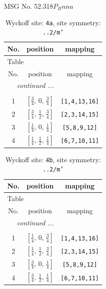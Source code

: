 \documentclass[fleqn,8pt]{jsarticle}
\begin{document}
\setcounter{MaxMatrixCols}{32}

\renewcommand{\tablename}{Table~}
\renewcommand{\figurename}{Figure~}
\begin{center}
\LARGE
MSG No. 52.318\quad$P_{B}nna$
\end{center}
\renewcommand{\arraystretch}{1.2}
\begin{longtable}{ccc}
\caption{Wyckoff site: {\tt 4a}, site symmetry: {\tt ..2/m'}}
 \\
 \hline \hline
No. & position & mapping \\ \hline \endfirsthead

\multicolumn{2}{l}{\tablename\ \thetable{}} \\
 \hline \hline
No. & position & mapping \\ \hline \endhead

 \hline \hline
\multicolumn{2}{r}{\footnotesize\it continued ...} \\ \endfoot

 \hline \hline
\multicolumn{2}{r}{} \\ \endlastfoot

1 & $\left[ \frac{3}{4},\, 0,\, \frac{3}{4} \right]$ & {\tt [1,4,13,16]} \\ \hline
2 & $\left[ \frac{3}{4},\, \frac{1}{2},\, \frac{3}{4} \right]$ & {\tt [2,3,14,15]} \\ \hline
3 & $\left[ \frac{1}{4},\, 0,\, \frac{1}{4} \right]$ & {\tt [5,8,9,12]} \\ \hline
4 & $\left[ \frac{1}{4},\, \frac{1}{2},\, \frac{1}{4} \right]$ & {\tt [6,7,10,11]} \\
\end{longtable}
\renewcommand{\arraystretch}{1.2}
\begin{longtable}{ccc}
\caption{Wyckoff site: {\tt 4b}, site symmetry: {\tt ..2/m'}}
 \\
 \hline \hline
No. & position & mapping \\ \hline \endfirsthead

\multicolumn{2}{l}{\tablename\ \thetable{}} \\
 \hline \hline
No. & position & mapping \\ \hline \endhead

 \hline \hline
\multicolumn{2}{r}{\footnotesize\it continued ...} \\ \endfoot

 \hline \hline
\multicolumn{2}{r}{} \\ \endlastfoot

1 & $\left[ \frac{1}{4},\, 0,\, \frac{3}{4} \right]$ & {\tt [1,4,13,16]} \\ \hline
2 & $\left[ \frac{1}{4},\, \frac{1}{2},\, \frac{3}{4} \right]$ & {\tt [2,3,14,15]} \\ \hline
3 & $\left[ \frac{3}{4},\, 0,\, \frac{1}{4} \right]$ & {\tt [5,8,9,12]} \\ \hline
4 & $\left[ \frac{3}{4},\, \frac{1}{2},\, \frac{1}{4} \right]$ & {\tt [6,7,10,11]} \\
\end{longtable}
\end{document}
